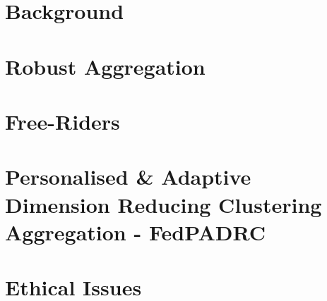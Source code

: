 \documentclass[12pt,twoside]{report}
\begin{document}
\chapter{Background}


\chapter{Robust Aggregation}


\chapter{Free-Riders}


\chapter{Personalised \& Adaptive Dimension Reducing Clustering Aggregation - FedPADRC}


\chapter{Ethical Issues}





\begin{appendices}

\end{appendices}
\end{document}
